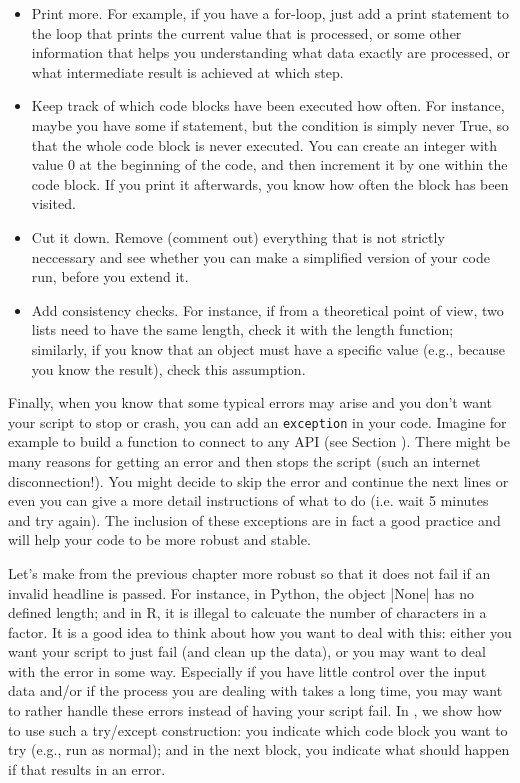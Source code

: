 \begin{itemize}
  \item Print more. For example, if you have a for-loop, just add a print statement to the loop that prints the current value that is processed, or some other information that helps you understanding what data exactly are processed, or what intermediate result is achieved at which step.
  \item Keep track of which code blocks have been executed how often. For instance, maybe you have some if statement, but the condition is simply never True, so that the whole code block is never executed. You can create an integer with value 0 at the beginning of the code, and then increment it by one within the code block. If you print it afterwards, you know how often the block has been visited.
  \item Cut it down. Remove (comment out) everything that is not strictly neccessary and see whether you can make a simplified version of your code run, before you extend it.
  \item Add consistency checks. For instance, if from a theoretical point of view, two lists need to have the same length, check it with the length function; similarly, if you know that an object must have a specific value (e.g., because you know the result), check this assumption.
\end{itemize}


Finally, when you know that some typical errors may arise and you don't want your script to stop or crash, you can add an \texttt{exception} in your code. Imagine for example to build a function to connect to any API (see Section ). There might be many reasons for getting an error and then stops the script (such an internet disconnection!). You might decide to skip  the error and continue the next lines or even you can give a more detail instructions of what to do (i.e. wait 5 minutes and try again). The inclusion of these exceptions are in fact a good practice and will help your code to be more robust and stable.

Let's make  from the previous chapter more robust so that it does not fail if an invalid headline is passed. For instance, in Python, the object |None| has no defined length; and in R, it is illegal to calcuate the number of characters in a factor. It is a good idea to think about how you want to deal with this: either you want your script to just fail (and clean up the data), or you may want to deal with the error in some way. Especially if you have little control over the input data and/or if the process you are dealing with takes a long time, you may want to rather handle these errors instead of having your script fail. In , we show how to use such a try/except construction: you indicate which code block you want to try (e.g., run as normal); and in the next block, you indicate what should happen if that results in an error.

